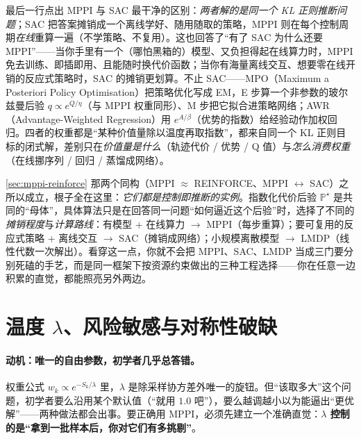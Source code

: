 \noindent 最后一行点出 MPPI 与 SAC 最干净的区别：\emph{两者解的是同一个 KL 正则推断问题}；SAC 把答案摊销成一个离线学好、随用随取的策略，MPPI 则在每个控制周期\emph{在线}重算一遍（不学策略、不复用）。这也回答了“有了 SAC 为什么还要 MPPI”——当你手里有一个（哪怕黑箱的）模型、又负担得起在线算力时，MPPI 免去训练、即插即用、且能随时换代价函数；当你有海量离线交互、想要零在线开销的反应式策略时，SAC 的摊销更划算。不止 SAC——MPO（Maximum a Posteriori Policy Optimisation）把策略优化写成 EM，E 步算一个非参数的玻尔兹曼后验 $q\propto e^{Q/\eta}$（与 MPPI 权重同形）、M 步把它拟合进策略网络\cite{abdolmaleki2018maximum}；AWR（Advantage-Weighted Regression）用 $e^{A/\beta}$（优势的指数）给经验动作加权回归\cite{peng2019advantage}。四者的权重都是“某种价值量除以温度再取指数”，都来自同一个 KL 正则目标的闭式解，差别只在\emph{价值量是什么}（轨迹代价 / 优势 / Q 值）与\emph{怎么消费权重}（在线挪序列 / 回归 / 蒸馏成网络）。

\begin{insight}
\cref{sec:mppi-reinforce} 那两个同构（MPPI $\approx$ REINFORCE、MPPI $\leftrightarrow$ SAC）之所以成立，根子全在这里：\emph{它们都是控制即推断的实例}。指数化代价后验 $\mathbb{P}^\star$ 是共同的“母体”，具体算法只是在回答同一问题“如何逼近这个后验”时，选择了不同的\emph{摊销程度}与\emph{计算路线}：有模型 + 在线算力 $\to$ MPPI（每步重算）；要可复用的反应式策略 + 离线交互 $\to$ SAC（摊销成网络）；小规模离散模型 $\to$ LMDP（线性代数一次解出）。看穿这一点，你就不会把 MPPI、SAC、LMDP 当成三门要分别死磕的手艺，而是同一框架下按资源约束做出的三种工程选择——你在任意一边积累的直觉，都能照亮另外两边。
\end{insight}

\section{温度 \texorpdfstring{$\lambda$}{lambda}、风险敏感与对称性破缺}
\label{sec:mppi-temperature}

\paragraph{动机：唯一的自由参数，初学者几乎总答错。}
权重公式 $w_k\propto e^{-S_k/\lambda}$ 里，$\lambda$ 是除采样协方差外唯一的旋钮。但“该取多大”这个问题，初学者要么沿用某个默认值（“就用 $1.0$ 吧”），要么越调越小以为能逼出“更优解”——两种做法都会出事。要正确用 MPPI，必须先建立一个准确直觉：\textbf{$\lambda$ 控制的是“拿到一批样本后，你对它们有多挑剔”}。

